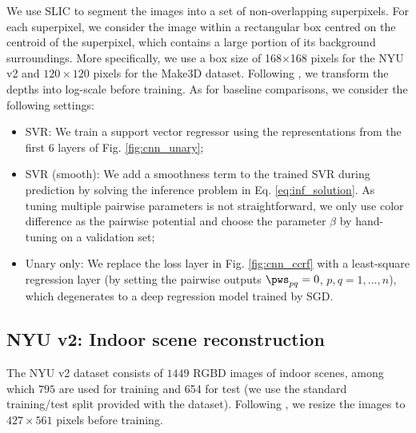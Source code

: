 We use SLIC \cite{slic_pami12} to segment the images into a set of non-overlapping superpixels. For each superpixel, we consider the image within a rectangular box centred on the centroid of the superpixel, which contains a large portion of its background surroundings. More specifically, we use a box size of 168$\times$168 pixels for the NYU v2 and $120 \times 120$ pixels for the Make3D dataset.
%
Following \cite{make3d_pami09,Liu_cvpr12,dcnn_nips14}, we transform the depths into log-scale before training.
%
As for baseline comparisons, we consider the following settings:
\begin{itemize}
\vspace{-.12cm} \item
SVR: We train a support vector regressor using the \cnn representations from the first 6 layers of Fig. \ref{fig:cnn_unary}; 
\vspace{-.12cm} \item
SVR (smooth): We add a smoothness term to the trained SVR during prediction by solving the inference problem in Eq. \eqref{eq:inf_solution}. As tuning multiple pairwise parameters is not straightforward, we only use color difference as the pairwise potential and choose the parameter $\beta$ by hand-tuning on a validation set;
\vspace{-.12cm} \item
Unary only: We replace the \crf loss layer in Fig. \ref{fig:cnn_ccrf} with a least-square regression layer (by setting the pairwise outputs $\pws_{pq}=0$, $p,q=1,...,n$), which degenerates to a deep regression model trained by SGD.
\end{itemize}
 



























\subsection{NYU v2: Indoor scene reconstruction}
The NYU v2 dataset consists of $1449$ RGBD images of indoor scenes, among which $795$ are used for training and 654 for test (we use the standard training/test split provided with the dataset).
Following \cite{Miaomiao_cvpr14}, we resize the images to $427 \times 561$ pixels 
before training.%


